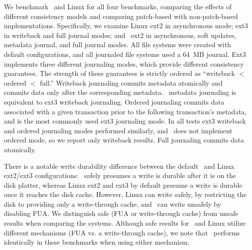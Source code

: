 We benchmark \Kudos\ and Linux for all four benchmarks, comparing the
effects of different consistency models and comparing patch-based with
non-patch-based implementations.
%
Specifically, we examine Linux ext2 in asynchronous mode; ext3 in
writeback and full journal modes; and \Kudos\ ext2 in
asynchronous, soft updates, metadata journal, and full journal modes.  All
file systems were created with default configurations, and all journaled
file systems used a 64~MB journal.
%
Ext3 implements three different journaling modes, which provide different
consistency guarantees.
The strength of these guarantees is strictly ordered as
``writeback $<$ ordered $<$ full.''
Writeback journaling commits metadata atomically and commits data only
after the corresponding metadata. \Kudos\ metadata journaling is
equivalent to ext3 writeback journaling.
%
Ordered journaling commits data associated with a given transaction
prior to the following transaction's metadata, and is the most
commonly used ext3 journaling mode.
%
In all tests ext3 writeback and ordered journaling modes performed
similarly, and \Kudos\ does not implement ordered mode, so we report
only writeback results.
%
Full journaling commits data atomically.

There is a notable write durability difference between the default
\Kudos\ and Linux ext2/ext3 configurations: \Kudos\ safely presumes a write
is durable after it is on the disk platter, whereas Linux ext2 and
ext3 by default presume a write is durable once it reaches the disk cache.
However, Linux can write safely, by restricting the disk to providing only
a write-through cache, and \Kudos\ can write unsafely by disabling FUA.
%
We distinguish safe (FUA or write-through cache) from unsafe results
when comparing the systems.
%
Although safe results for \Kudos\ and Linux utilize different
mechanisms (FUA vs. a write-through cache), we note that \Kudos\
performs identically in these benchmarks when using either mechanism.

\benchtable{}


